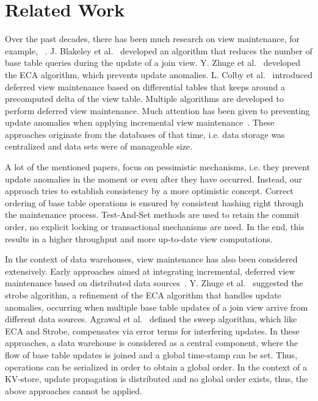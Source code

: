\section{Related Work}
\label{sec:related_work}


Over the past decades, there has been much research on view maintenance, 
for example, ~\cite{blakeley:efficiently,gupta:maintaining, zhuge:view, 
colby:algorithms, wang:efficient}. J. Blakeley et 
al.~\cite{blakeley:efficiently} developed an algorithm that reduces the 
number of base table queries during the update of a join view. Y. Zhuge 
et al.~\cite{zhuge:view} developed the ECA algorithm, which prevents 
update anomalies. L. Colby et al.~\cite{colby:algorithms} introduced 
deferred view maintenance based on differential tables that keeps around 
a precomputed delta of the view table. Multiple algorithms are developed 
to perform deferred view maintenance. Much attention has been given to 
preventing update anomalies when applying incremental view 
maintenance~\cite{gupta:maintaining, zhuge:view, salem:how}. These 
approaches originate from the databases of that time, i.e. data storage 
was centralized and data sets were of manageable size. 

A lot of the mentioned papers, focus on pessimistic mechanisms, i.e. 
they prevent update anomalies in the moment or even after they have 
occurred. Instead, our approach tries to establish consistency by a more 
optimistic concept. Correct ordering of base table operations is ensured 
by consistent hashing right through the maintenance process. 
Test-And-Set methods are used to retain the commit order, no explicit 
locking or transactional mechanisms are need. In the end, this results 
in a higher throughput and more up-to-date view computations. 

In the context of data warehouses, view maintenance has also been 
considered extensively. Early approaches aimed at integrating 
incremental, deferred view maintenance based on distributed data 
sources~\cite{wang:efficient, agrawal:efficient,zhuge:strobe}. Y. Zhuge 
et al.~\cite{zhuge:strobe} suggested the strobe algorithm, a refinement 
of the ECA algorithm that handles update anomalies, occurring when 
multiple base table updates of a join view arrive from different data 
sources. Agrawal et al.~\cite{agrawal:efficient} defined the sweep 
algorithm, which like ECA and Strobe, compensates via error terms for 
interfering updates. In these approaches, a data warehouse is considered 
as a central component, where the flow of base table updates is joined 
and a global time-stamp can be set. Thus, operations can be serialized 
in order to obtain a global order. In the context of a KV-store, update 
propagation is distributed and no global order exists, thus, the above 
approaches cannot be applied. 

